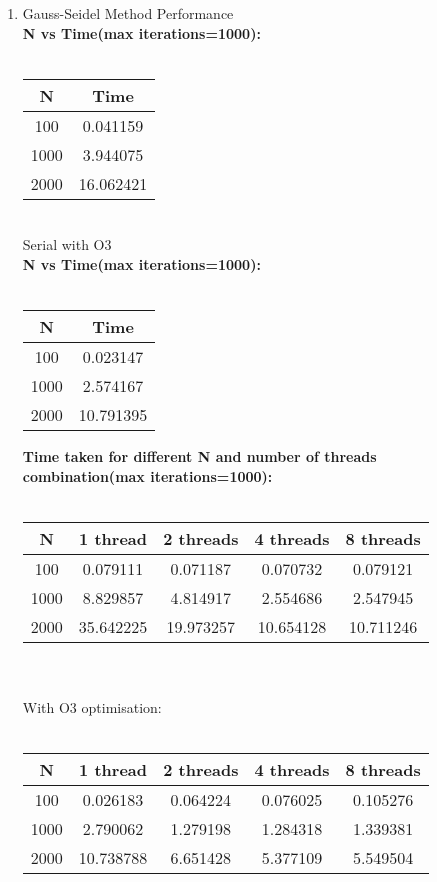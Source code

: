 \documentclass[12pt,letterpaper]{article}
\begin{document}
\begin{enumerate}
\begin{tabular}{ |c|c|c|c|c| }
\hline 
\end{tabular}
\\\\

\item Gauss-Seidel Method Performance \\

    \textbf{N vs Time(max iterations=1000):} \\\\
    \begin{tabular}{ |c|c| } 
 \hline
  N & Time  \\ 
 \hline \hline 
  100    & 0.041159   \\
  1000 & 3.944075  \\
  2000 & 16.062421 \\ 
\hline 
\end{tabular} \\
  Serial with O3\\
    \textbf{N vs Time(max iterations=1000):} \\\\
    \begin{tabular}{ |c|c| } 
 \hline
  N & Time  \\ 
 \hline \hline 
  100    &  0.023147  \\
  1000 &  2.574167 \\
  2000 & 10.791395 \\ 
\hline 
\end{tabular}
  

    \textbf{Time taken for different N and number of threads combination(max iterations=1000):} \\\\
\begin{tabular}{ |c|c|c|c|c| } 
 \hline
  N & 1 thread & 2 threads & 4 threads & 8 threads  \\ 
 \hline \hline 
  100 & 0.079111 & 0.071187  & 0.070732 & 0.079121 \\
  1000 & 8.829857 &  4.814917 & 2.554686 & 2.547945 \\
  2000 & 35.642225 & 19.973257 & 10.654128  & 10.711246 \\
 
\hline 
\end{tabular}
\\\\
With O3 optimisation: \\\
\begin{tabular}{ |c|c|c|c|c| } 
 \hline
  N & 1 thread & 2 threads & 4 threads & 8 threads  \\ 
 \hline \hline 
  100 & 0.026183 &  0.064224  &  0.076025 & 0.105276 \\
  1000 &  2.790062 & 1.279198 & 1.284318 & 1.339381 \\
  2000 & 10.738788 & 6.651428 & 5.377109 &  5.549504 \\
 
\hline 
\end{tabular}
\\\\




\end{enumerate}
\end{document}

